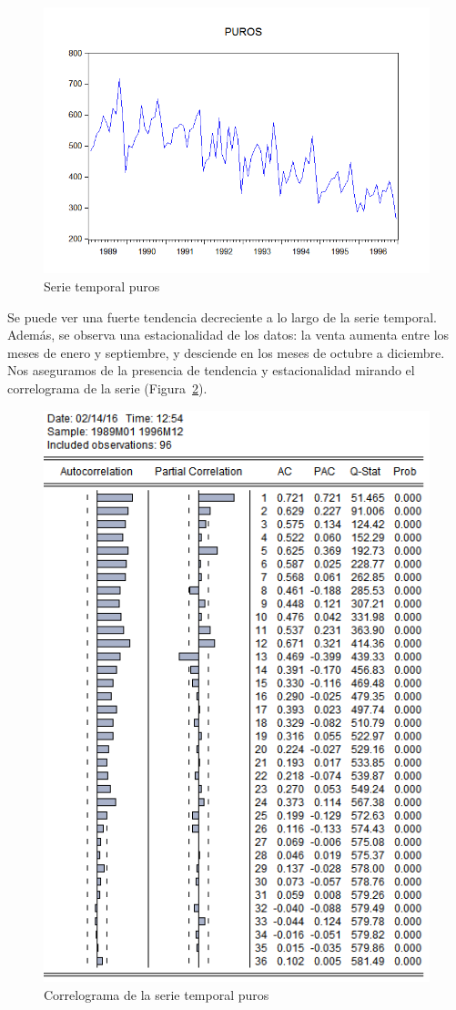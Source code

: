 \documentclass[12pt,a4paper,twoside,openright,titlepage,final]{article}
\begin{document}
\begin{figure}[tbph!]
	\centering
	\includegraphics[width=0.8\linewidth]{imagenes/puros/puros.png}
	\caption{Serie temporal puros}
	\label{fig:puros}
\end{figure} 

Se puede ver una fuerte tendencia decreciente a lo largo de la serie temporal. Además, se observa una estacionalidad de los datos: la venta aumenta entre los meses de enero y septiembre, y desciende en los meses de octubre a diciembre.\\

Nos aseguramos de la presencia de tendencia y estacionalidad mirando el correlograma de la serie (Figura~\ref{fig:correlograma-puros}).\\

\begin{figure}[tbph!]
	\centering
	\includegraphics[width=0.8\linewidth]{imagenes/puros/correlograma-puros.png}
	\caption{Correlograma de la serie temporal puros}
	\label{fig:correlograma-puros}
\end{figure}
\end{document}
